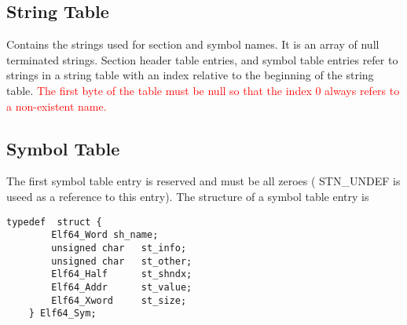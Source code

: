 \documentclass[paper=a4, fontsize=11pt]{report} %
\numberwithin{equation}{section} %
\numberwithin{figure}{section} %
\numberwithin{table}{section} %
\begin{document}
\subsection{String Table}
Contains the strings used for section and symbol names. It is an array of null 
terminated strings. Section header table entries, and symbol table entries 
refer to strings in a string table with an index relative to the beginning of 
the string table. \textcolor{red}{The first byte of the table must be null so 
that the index 0 always refers to a non-existent name.}

\subsection{Symbol Table}
The first symbol table entry is reserved and must be all zeroes ({\ttfamily 
STN\_UNDEF} is useed as a reference to this entry).
The structure of a symbol table entry is

\begin{lstlisting}[style=ansic, caption={Symbol Table Entry}, label=shdr]
	typedef  struct {
		Elf64_Word sh_name;
		unsigned char 	st_info;
		unsigned char 	st_other;
		Elf64_Half 		st_shndx;
		Elf64_Addr 		st_value;
		Elf64_Xword 	st_size;
	} Elf64_Sym;
\end{lstlisting}
\end{document}
